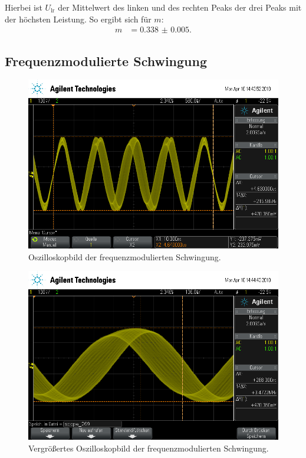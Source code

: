 Hierbei ist $U_\text{lr}$ der Mittelwert des linken und des rechten Peaks der drei Peaks mit der höchsten Leistung.
So ergibt sich für $m$:
\begin{align*}
  m &= \num{0.338(5)}.
\end{align*}

\subsection{Frequenzmodulierte Schwingung}

\begin{figure}[h]
  \centering
  \includegraphics[width=.9\textwidth]{Oszi_Pics/freqModRing.png}
  \caption{Oszilloskopbild der frequenzmodulierten Schwingung.}
  \label{fig:freqModRing}
\end{figure}

\begin{figure}[h]
  \centering
  \includegraphics[width=.9\textwidth]{Oszi_Pics/freqModZoom.png}
  \caption{Vergrößertes Oszilloskopbild der frequenzmodulierten Schwingung.}
  \label{fig:freqModZoom}
\end{figure}

